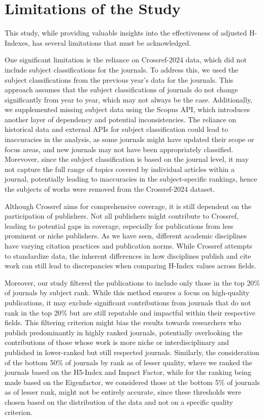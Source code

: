 \section{Limitations of the Study}

This study, while providing valuable insights into the effectiveness of
adjusted H-Indexes, has several limitations that must be acknowledged.

One significant limitation is the reliance on Crossref-2024 data, which did not
include subject classifications for the journals. To address this, we used the
subject classifications from the previous year’s data for the journals. This
approach assumes that the subject classifications of journals do not change
significantly from year to year, which may not always be the case.
Additionally, we supplemented missing subject data using the Scopus API, which
introduces another layer of dependency and potential inconsistencies. The
reliance on historical data and external APIs for subject classification could
lead to inaccuracies in the analysis, as some journals might have updated their
scope or focus areas, and new journals may not have been appropriately
classified. Morevover, since the subject classification is based on the journal
level, it may not capture the full range of topics covered by individual
articles within a journal, potentially leading to inaccuracies in the
subject-specific rankings, hence the subjects of works were removed from the
Crossref-2024 dataset.

Although Crossref aims for comprehensive coverage, it is still dependent on the
participation of publishers. Not all publishers might contribute to Crossref,
leading to potential gaps in coverage, especially for publications from less
prominent or niche publishers. As we have seen, different academic disciplines
have varying citation practices and publication norms. While Crossref attempts
to standardize data, the inherent differences in how disciplines publish and
cite work can still lead to discrepancies when comparing H-Index values across
fields.

Moreover, our study filtered the publications to include only those in the top
20\% of journals by subject rank. While this method ensures a focus on
high-quality publications, it may exclude significant contributions from
journals that do not rank in the top 20\% but are still reputable and impactful
within their respective fields. This filtering criterion might bias the results
towards researchers who publish predominantly in highly ranked journals,
potentially overlooking the contributions of those whose work is more niche or
interdisciplinary and published in lower-ranked but still respected journals.
Similarly, the consideration of the bottom 50\% of journals by rank as of
lesser quality, where we ranked the journals based on the H5-Index and Impact
Factor, while for the ranking being made based on the Eigenfactor, we
considered those at the bottom 5\% of journals as of lesser rank, might not be
entirely accurate, since these thresholds were chosen based on the distribution
of the data and not on a specific quality criterion. %

